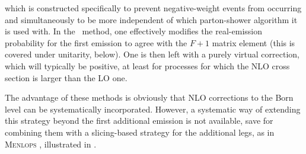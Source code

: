 which is
constructed specifically to prevent negative-weight events from
occurring and simultaneously to be more independent of which
parton-shower algorithm it is used with. In the \Pw\ method, 
one effectively modifies the real-emission probability for the first
emission
to agree with
the $F+1$ matrix element (this is covered under unitarity, below). One
is then left with a purely virtual correction, which will typically be
positive, at least for processes for which the NLO cross section is
larger than the LO one. 

%
%
The advantage of these methods
is obviously that NLO corrections to the Born level can be
systematically incorporated. However, a systematic way of
extending this strategy beyond the first additional emission is not
available, save for combining them with a slicing-based strategy
for the additional legs, as in \textsc{Menlops}
\cite{Hamilton:2010wh}, illustrated in . 
